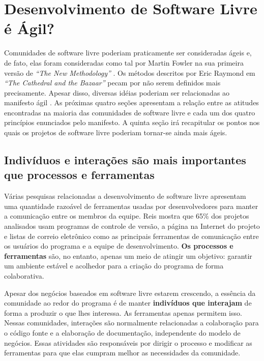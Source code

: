\chapter{Desenvolvimento de Software Livre é Ágil?}
\label{cap:foss}

Comunidades de software livre poderiam praticamente ser consideradas
ágeis e, de fato, elas foram consideradas como tal por Martin Fowler
na sua primeira versão de \emph{``The New Methodology''}
\cite{Fowler00orig}. Os métodos descritos por Eric Raymond em
\emph{``The Cathedral and the Bazaar''} \cite{Raymond1999} pecam por
não serem definidos mais precisamente. Apesar disso, diversas idéias
poderiam ser relacionadas ao manifesto ágil \cite{AgileManifesto}. As
próximas quatro seções apresentam a relação entre as atitudes
encontradas na maioria das comunidades de software livre e cada um dos
quatro princípios enunciados pelo manifesto. A quinta seção irá
recapitular os pontos nos quais os projetos de software livre poderiam
tornar-se ainda mais ágeis.

\section{Indivíduos e interações são mais importantes que processos e
  ferramentas}
\label{sec:first-princ}

Várias pesquisas relacionadas a desenvolvimento de software livre
apresentam uma quantidade razoável de ferramentas usadas por
desenvolvedores para manter a comunicação entre os membros da
equipe. Reis \cite{Reis2003} mostra que 65\% dos projetos analisados
usam programas de controle de versão, a página na Internet do projeto
e listas de correio eletrônico como as principais ferramentas de
comunicação entre os usuários do programa e a equipe de
desenvolvimento. \textbf{Os processos e ferramentas} são, no entanto,
apenas um meio de atingir um objetivo: garantir um ambiente estável e
acolhedor para a criação do programa de forma colaborativa.

Apesar dos negócios baseados em software livre estarem crescendo, a
essência da comunidade ao redor do programa é de manter
\textbf{indivíduos que interajam} de forma a produzir o que lhes
interessa. As ferramentas apenas permitem isso. Nessas comunidades,
interações são normalmente relacionadas a colaboração para o código
fonte e a elaboração de documentação, independente do modelo de
negócios. Essas atividades são responsáveis por dirigir o processo e
modificar as ferramentas para que elas cumpram melhor as necessidades
da comunidade.

